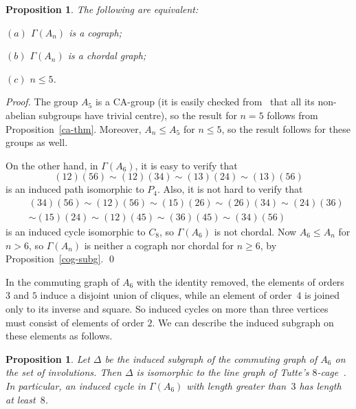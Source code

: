 \documentclass{elsarticle}
\newtheorem{prop}[theorem]{Proposition}
\begin{document}
\begin{prop}\label{ag-cg}
The following are equivalent{\rm:}

$(a)$ $\Gamma(A_n)$ is a cograph{\rm;}

$(b)$ $\Gamma(A_n)$ is a chordal graph{\rm;}

$(c)$ $n\le 5$.
\end{prop}

\begin{proof}
The group $A_5$ is a CA-group (it is easily checked from~\cite{CC85} that all
its non-abelian  subgroups have trivial centre), so the result for
$n=5$ follows from Proposition~\ref{ca-thm}. Moreover, $A_n\le A_5$ for $n\le 5$,
so the result follows for these groups as well.

On the other hand, in $\Gamma(A_6)$, it is easy to verify that
$$
(12)(56)\sim(12)(34)\sim(13)(24)\sim(13)(56)
$$
is an induced path isomorphic to $P_4$.
Also, it is not hard to verify that
\begin{eqnarray*}
&&(34)(56)\sim(12)(56)\sim(15)(26)\sim(26)(34)\sim(24)(36)\\
&&\sim(15)(24)\sim(12)(45)\sim(36)(45)\sim(34)(56)
\end{eqnarray*}
is an induced cycle isomorphic to $C_8$, so $\Gamma(A_6)$ is not chordal.
Now $A_6\le A_n$ for $n>6$, so $\Gamma(A_n)$ is neither a cograph nor chordal
for $n\ge6$, by Proposition~\ref{cog-subg}.
\qed
\end{proof}

In the commuting graph of $A_6$ with the identity removed, the elements of
orders $3$ and $5$ induce a disjoint union of cliques, while an element of
order~$4$ is joined only to its inverse and square. So induced cycles on
more than three vertices must consist of elements of order $2$. We can describe
the induced subgraph on these elements as follows.

\begin{prop}
Let $\Delta$ be the induced subgraph of the commuting graph of $A_6$ on the set
of involutions. Then $\Delta$ is isomorphic to the line graph of Tutte's
$8$-cage~\cite{Tutte}. In particular, an induced cycle in $\Gamma(A_6)$ with
length greater than~$3$ has length at least~$8$.
\end{prop}
\end{document}
